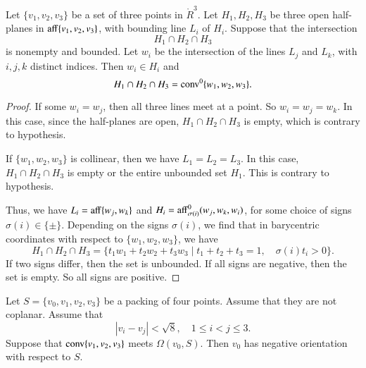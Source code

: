 \begin{tarskidata}
\begin{tarski}
\begin{lemma}
Let $\{v_1,v_2,v_3\}$ be a set of three points
in $\ring{R}^3$.  Let $H_1,H_2,H_3$ be three open half-planes in
${\operatorname{aff}}\{v_1,v_2,v_3\}$, with bounding line $L_i$ of $H_i$.  
Suppose that the intersection
   $$H_1\cap H_2\cap H_3$$
is nonempty and bounded.  Let $w_i$ be the intersection of the
lines $L_j$ and $L_k$, with $i,j,k$ distinct indices.  Then
$w_i\in H_i$ and
   $$H_1\cap H_2\cap H_3 = {\operatorname{conv}}^0\{w_1,w_2,w_3\}.$$
\end{lemma}

\begin{proof}  If some $w_i=w_j$, then all three lines meet
at a point.  So $w_i=w_j=w_k$.  In this case, since the half-planes
are open, $H_1\cap H_2\cap H_3$ is empty, which is contrary to 
hypothesis.  

If $\{w_1,w_2,w_3\}$ is collinear, then we have $L_1=L_2=L_3$.
In this case, $H_1\cap H_2\cap H_3$ is empty or the entire
unbounded set $H_1$.  This is contrary to hypothesis.

Thus, we have $L_i = {\operatorname{aff}}\{w_j,w_k\}$ and
$H_i = {\operatorname{aff}}^0_{\sigma(i)}({w_j,w_k},w_i)$, for some choice of
signs $\sigma(i)\in\{\pm\}$.  
Depending on the signs $\sigma(i)$, we find that in barycentric
coordinates with respect to $\{w_1,w_2,w_3\}$, we have
  $$H_1\cap H_2\cap H_3 =
    \{ t_1 w_1 + t_2 w_2 +t_3 w_3 \mid
         t_1 + t_2 + t_3 = 1,\quad  \sigma(i)t_i > 0\}.$$
If two signs differ, then the set is unbounded.  If all signs
are negative, then the set is empty.  So all signs are positive.
\end{proof}
\end{tarski}






\begin{tarski}

\begin{lemma}
Let $S=\{v_0,v_1,v_2,v_3\}$ be a packing of four points.
Assume that they are not coplanar.
Assume that 
$$
|v_i-v_j|<\sqrt8,\quad 1\le i < j \le 3.
$$
  Suppose that
${\operatorname{conv}}\{v_1,v_2,v_3\}$ meets $\Omega(v_0,S)$.  Then $v_0$ has negative
orientation with respect to $S$.
\end{lemma}


\end{tarski}
\end{tarskidata}

